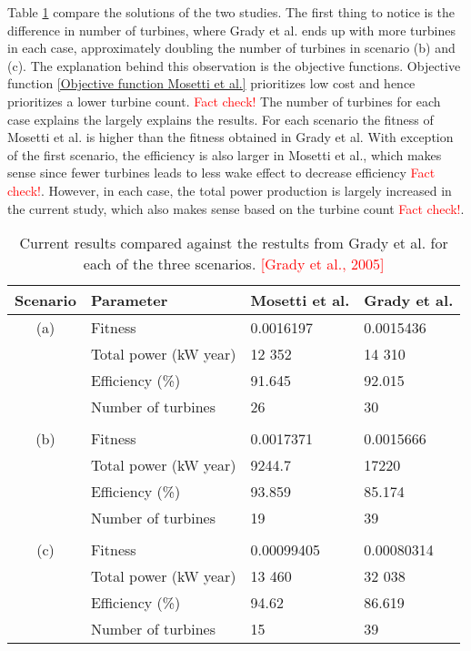 \noindent Table \ref{Results Grady et al.} compare the solutions of the two studies. The first thing to notice is the difference in number of turbines, where Grady et al. ends up with more turbines in each case, approximately doubling the number of turbines in scenario (b) and (c). The explanation behind this observation is the objective functions. Objective function \ref{Objective function Mosetti et al.} prioritizes low cost and hence prioritizes a lower turbine count. \textcolor{red}{Fact check!} The number of turbines for each case explains the largely explains the results. For each scenario the fitness of Mosetti et al. is higher than the fitness obtained in Grady et al. With exception of the first scenario, the efficiency is also larger in Mosetti et al., which makes sense since fewer turbines leads to less wake effect to decrease efficiency \textcolor{red}{Fact check!}. However, in each case, the total power production is largely increased in the current study, which also makes sense based on the turbine count \textcolor{red}{Fact check!}. \\


\begin{table}[h!]
\begin{center}
\caption{Current results compared against the restults from Grady et al. for each of the three scenarios. \textcolor{red}{[Grady et al., 2005]}}
\label{Results Grady et al.}
\begin{tabular}{c|l|l|l}
Scenario & Parameter                    & Mosetti et al.  & Grady et al. \\ 
\hline 
(a)          & Fitness                        & 0.0016197     & 0.0015436 \\ 
              & Total power (kW year) & 12 352           & 14 310 \\ 
              & Efficiency (\%)            & 91.645            & 92.015 \\ 
              & Number of turbines     & 26                    & 30  \\ 
&&&\\
(b)         & Fitness                        & 0.0017371      & 0.0015666 \\ 
              & Total power (kW year) & 9244.7           & 17220 \\ 
              & Efficiency (\%)            & 93.859           & 85.174 \\ 
              & Number of turbines     & 19                   & 39 \\ 
&&&\\
(c)         & Fitness                        & 0.00099405   & 0.00080314 \\ 
              & Total power (kW year) & 13 460          & 32 038 \\ 
              & Efficiency (\%)            & 94.62            & 86.619 \\ 
              & Number of turbines     & 15                  & 39 \\  
\end{tabular} 
\end{center}
\end{table}


